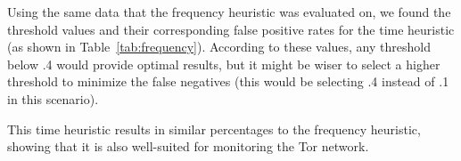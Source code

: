Using the same data that the frequency heuristic was evaluated on, we found the threshold values and their corresponding false positive rates for the time heuristic (as shown in Table~\ref{tab:frequency}).  According to these values, any threshold below .4 would provide optimal results, but it might be wiser to select a higher threshold to minimize the false negatives (this would be selecting .4 instead of .1 in this scenario).

This time heuristic results in similar percentages to the frequency heuristic, showing that it is also well-suited for monitoring the Tor network.  

